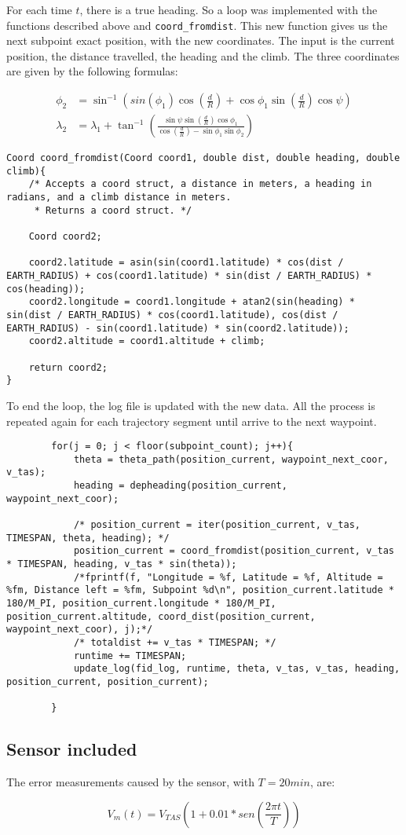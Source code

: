 \documentclass{article}
\begin{document}
For each time $t$, there is a true heading. So a loop was implemented with the functions described above and \texttt{coord_fromdist}. This new function gives us the next subpoint exact position, with the new coordinates. The input is the current position, the distance travelled, the heading and the climb. The three coordinates are given by the following formulas:

\begin{align*}
    \phi_2 &= \sin^{-1}\left(sin(\phi_1)\cos\left(\frac{d}{R}\right) + \cos\phi_1\sin\left(\frac{d}{R}\right)\cos\psi\right) \\
    \lambda_2 &= \lambda_1 + \tan^{-1}\left(\frac{\sin\psi\sin\left(\frac{d}{R}\right)\cos\phi_1}{\cos\left(\frac{d}{R}\right) - \sin\phi_1\sin\phi_2}\right)
\end{align*}  


\begin{verbatim}
Coord coord_fromdist(Coord coord1, double dist, double heading, double climb){
    /* Accepts a coord struct, a distance in meters, a heading in radians, and a climb distance in meters.
     * Returns a coord struct. */
    
    Coord coord2;
    
    coord2.latitude = asin(sin(coord1.latitude) * cos(dist / EARTH_RADIUS) + cos(coord1.latitude) * sin(dist / EARTH_RADIUS) * cos(heading));
    coord2.longitude = coord1.longitude + atan2(sin(heading) * sin(dist / EARTH_RADIUS) * cos(coord1.latitude), cos(dist / EARTH_RADIUS) - sin(coord1.latitude) * sin(coord2.latitude));
    coord2.altitude = coord1.altitude + climb;
    
    return coord2;
}
\end{verbatim}

To end the loop, the log file is updated with the new data. All the process is repeated again for each trajectory segment until arrive to the next waypoint.




\begin{verbatim}
        for(j = 0; j < floor(subpoint_count); j++){
            theta = theta_path(position_current, waypoint_next_coor, v_tas);
            heading = depheading(position_current, waypoint_next_coor);
            
            /* position_current = iter(position_current, v_tas, TIMESPAN, theta, heading); */
            position_current = coord_fromdist(position_current, v_tas * TIMESPAN, heading, v_tas * sin(theta));
            /*fprintf(f, "Longitude = %f, Latitude = %f, Altitude = %fm, Distance left = %fm, Subpoint %d\n", position_current.latitude * 180/M_PI, position_current.longitude * 180/M_PI, position_current.altitude, coord_dist(position_current, waypoint_next_coor), j);*/
            /* totaldist += v_tas * TIMESPAN; */
            runtime += TIMESPAN;
            update_log(fid_log, runtime, theta, v_tas, v_tas, heading, position_current, position_current);
            
        }
\end{verbatim}

\subsection{Sensor included}

The error measurements caused by the sensor, with $T=20min$, are:

\begin{equation}
V_m(t)=V_{TAS}(1+0.01*sen(\frac{2\pi t}{T}))
\end{equation}
\end{document}
